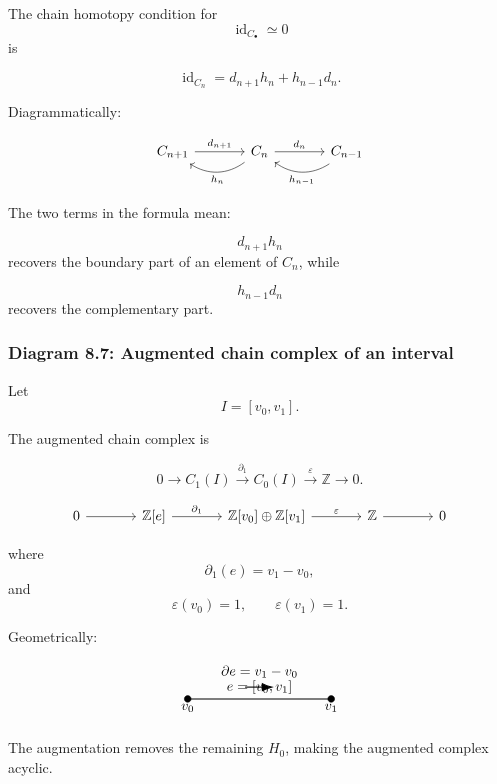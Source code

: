 \documentclass[12pt,a4paper]{article}
\theoremstyle{notespace}
\begin{document}
The chain homotopy condition for
\[
\operatorname{id}_{C_\bullet}\simeq 0
\]
is

\[
\operatorname{id}_{C_n}=d_{n+1}h_n+h_{n-1}d_n.
\]

Diagrammatically:

\[
\begin{tikzcd}[column sep=large,row sep=large]
	C_{n+1}
	\arrow[r,"d_{n+1}"]
	&
	C_n
	\arrow[r,"d_n"]
	\arrow[l,bend left=35,"h_n"]
	&
	C_{n-1}
	\arrow[l,bend left=35,"h_{n-1}"]
\end{tikzcd}
\]

The two terms in the formula mean:

\[
d_{n+1}h_n
\]
recovers the boundary part of an element of \(C_n\), while

\[
h_{n-1}d_n
\]
recovers the complementary part.

\subsubsection{Diagram 8.7: Augmented chain complex of an interval}

Let
\[
I=[v_0,v_1].
\]

The augmented chain complex is

\[
0\to C_1(I)\xrightarrow{\partial_1}C_0(I)\xrightarrow{\varepsilon}\mathbb Z\to 0.
\]

\[
\begin{tikzcd}[column sep=large]
	0
	\arrow[r]
	&
	\mathbb Z[e]
	\arrow[r,"\partial_1"]
	&
	\mathbb Z[v_0]\oplus \mathbb Z[v_1]
	\arrow[r,"\varepsilon"]
	&
	\mathbb Z
	\arrow[r]
	&
	0
\end{tikzcd}
\]

where
\[
\partial_1(e)=v_1-v_0,
\]
and
\[
\varepsilon(v_0)=1,
\qquad
\varepsilon(v_1)=1.
\]

Geometrically:

\[
\begin{tikzpicture}[scale=1.2]
	\filldraw (0,0) circle (2pt);
	\filldraw (3,0) circle (2pt);
	
	\draw[thick] (0,0) -- (3,0);
	
	\node[below] at (0,0) {$v_0$};
	\node[below] at (3,0) {$v_1$};
	\node[above] at (1.5,0) {$e=[v_0,v_1]$};
	
	\draw[-{Latex[length=3mm]}, thick] (1.2,0.25) -- (1.8,0.25);
	\node[above] at (1.5,0.35) {$\partial e=v_1-v_0$};
\end{tikzpicture}
\]

The augmentation removes the remaining \(H_0\), making the augmented complex acyclic.
\end{document}
